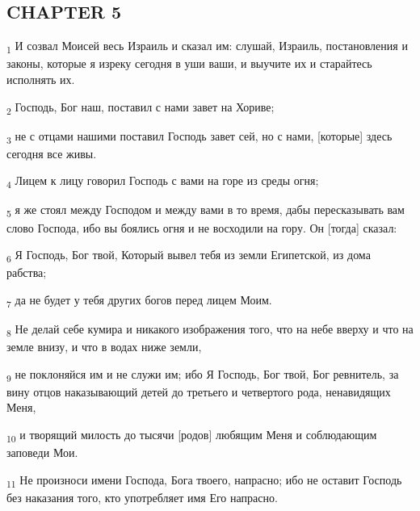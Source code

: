 \subsection{CHAPTER 5}
\begin{tcolorbox}
\textsubscript{1} И созвал Моисей весь Израиль и сказал им: слушай, Израиль, постановления и законы, которые я изреку сегодня в уши ваши, и выучите их и старайтесь исполнять их.
\end{tcolorbox}
\begin{tcolorbox}
\textsubscript{2} Господь, Бог наш, поставил с нами завет на Хориве;
\end{tcolorbox}
\begin{tcolorbox}
\textsubscript{3} не с отцами нашими поставил Господь завет сей, но с нами, [которые] здесь сегодня все живы.
\end{tcolorbox}
\begin{tcolorbox}
\textsubscript{4} Лицем к лицу говорил Господь с вами на горе из среды огня;
\end{tcolorbox}
\begin{tcolorbox}
\textsubscript{5} я же стоял между Господом и между вами в то время, дабы пересказывать вам слово Господа, ибо вы боялись огня и не восходили на гору. Он [тогда] сказал:
\end{tcolorbox}
\begin{tcolorbox}
\textsubscript{6} Я Господь, Бог твой, Который вывел тебя из земли Египетской, из дома рабства;
\end{tcolorbox}
\begin{tcolorbox}
\textsubscript{7} да не будет у тебя других богов перед лицем Моим.
\end{tcolorbox}
\begin{tcolorbox}
\textsubscript{8} Не делай себе кумира и никакого изображения того, что на небе вверху и что на земле внизу, и что в водах ниже земли,
\end{tcolorbox}
\begin{tcolorbox}
\textsubscript{9} не поклоняйся им и не служи им; ибо Я Господь, Бог твой, Бог ревнитель, за вину отцов наказывающий детей до третьего и четвертого рода, ненавидящих Меня,
\end{tcolorbox}
\begin{tcolorbox}
\textsubscript{10} и творящий милость до тысячи [родов] любящим Меня и соблюдающим заповеди Мои.
\end{tcolorbox}
\begin{tcolorbox}
\textsubscript{11} Не произноси имени Господа, Бога твоего, напрасно; ибо не оставит Господь без наказания того, кто употребляет имя Его напрасно.
\end{tcolorbox}
